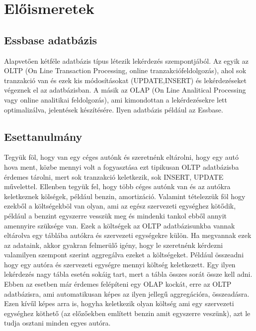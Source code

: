 \chapter{Előismeretek}\label{sect:Preliminaries}
\section{Essbase adatbázis}
Alapvetően kétféle adatbázis típus létezik lekérdezés szempontjából. Az egyik az OLTP (On Line Transaction Processing, online tranzakciófeldolgozás), ahol sok tranzakció van és ezek kis módosításokat (UPDATE,INSERT) és lekérdezéseket végeznek el az adatbázisban. A másik az OLAP (On Line Analitical Processing vagy online analitikai feldolgozás), ami kimondottan a lekérdezésekre lett optimalizálva, jelentések készítésére. Ilyen adatbázis például az Essbase.

\section{Esettanulmány}
Tegyük föl, hogy van egy céges autónk és szeretnénk eltárolni, hogy egy autó hova ment, közbe mennyi volt a fogyasztása ezt tipikusan OLTP adatbázisba érdemes tárolni, mert sok
tranzakció keletkezik, sok INSERT, UPDATE művelettel. Ellenben tegyük fel, hogy több céges autónk van és az autókra keletkeznek kölségek, például benzin, amortizáció. Valamint tételezzük föl hogy ezekből a költségekböl van olyan, ami az egész szervezeti egységhez kötődik, például a benzint egyszerre vesszük meg és mindenki tankol ebből annyit amennyire szüksége van. Ezek a költségek az OLTP adatbázisunkba vannak eltárolva
egy táblába autókra és szervezeti egységekre külön. Ha megvannak ezek az adataink, akkor gyakran felmerülő igény, hogy le szeretnénk kérdezni valamilyen szempont szerint aggregálva ezeket a költségeket. Például összeadni hogy egy autóra és szervezeti egységre mennyi költség keletkezett. Egy ilyen lekérdezés nagy tábla esetén sokáig tart, mert a tábla összes sorát össze kell adni.  Ebben az esetben már érdemes felépíteni egy OLAP kockát, erre az OLTP adatbázisra, ami automatikusan képes az ilyen jellegű aggregációra, összeadásra. Ezen kívűl képes arra is, hogyha keletkezik olyan költség ami egy szervezeti egységhez köthető (az előzőekben említett benzin amit egyszerre veszünk), azt le tudja osztani minden egyes autóra.

